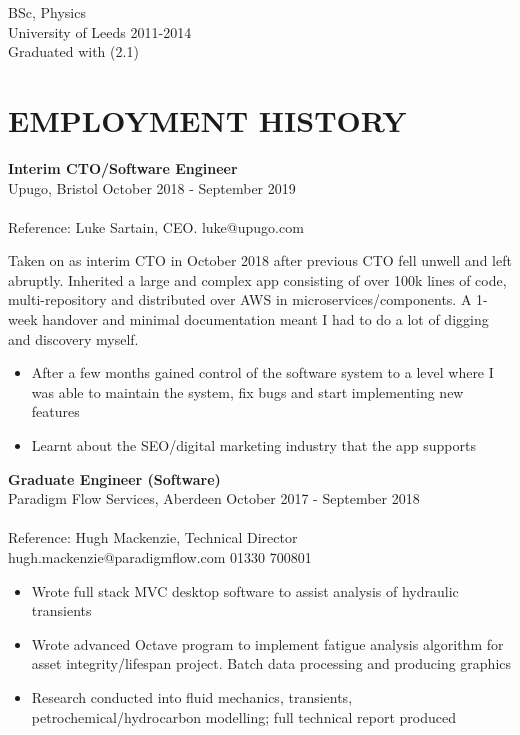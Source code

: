 \documentclass[margin, line, 10pt]{res} %
\begin{document}
\begin{resume}
BSc, Physics \\
University of Leeds 2011-2014 \\
Graduated with (2.1) 

\section{EMPLOYMENT HISTORY}

\textbf{Interim CTO/Software Engineer} \\
Upugo, Bristol \hfill October 2018 - September 2019\\\\
Reference: Luke Sartain, CEO. luke@upugo.com 

Taken on as interim CTO in October 2018 after previous CTO fell unwell and left abruptly. Inherited a large and complex app consisting of over 100k lines of code, multi-repository and distributed over AWS in microservices/components. A 1-week handover and minimal documentation meant I had to do a lot of digging and discovery myself. 
\begin{itemize}

\item After a few months gained control of the software system to a level where I was able to maintain the system, fix bugs and start implementing new features
\item Learnt about the SEO/digital marketing industry that the app supports

\end{itemize}

\textbf{Graduate Engineer (Software)} \\
Paradigm Flow Services, Aberdeen \hfill October 2017 - September 2018\\\\
Reference: Hugh Mackenzie, Technical Director \\
hugh.mackenzie@paradigmflow.com 01330 700801\\

\begin{itemize}

\item Wrote full stack MVC desktop software to assist analysis of hydraulic transients

\item Wrote advanced Octave program to implement fatigue analysis algorithm for asset integrity/lifespan project. Batch data processing and producing graphics

\item Research conducted into fluid mechanics, transients, petrochemical/hydrocarbon modelling; full technical report produced


\end{itemize}
\end{resume}
\end{document}
